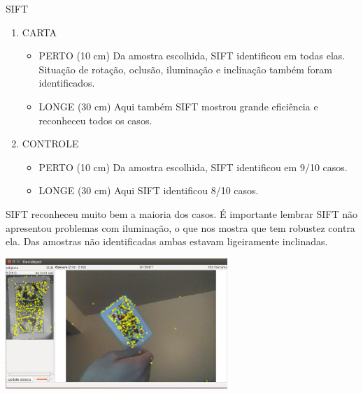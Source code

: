 \documentclass[conference]{IEEEtran}
\begin{document}
 \centering SIFT	\\
 \begin{enumerate}
  \item CARTA
    \begin{itemize}
     \item PERTO (10 cm)
      Da amostra escolhida, SIFT identificou em todas elas. Situa\c{c}\~ao de rota\c{c}\~ao, oclus\~ao, ilumina\c{c}\~ao 
      e inclina\c{c}\~ao tamb\'em foram identificados.
     \item LONGE (30 cm)
      Aqui tamb\'em SIFT mostrou grande efici\^encia e reconheceu todos os casos.
    \end{itemize}
  \item CONTROLE
    \begin{itemize}
     \item PERTO (10 cm)
      Da amostra escolhida, SIFT identificou em 9/10 casos.
     \item LONGE (30 cm)
      Aqui SIFT identificou 8/10 casos. 
    \end{itemize}
 \end{enumerate}

\vspace{1.2\baselineskip}\vspace{-\parskip} 
\raggedright
\nobreak\hspace{.16667em plus .08333em} 
SIFT reconheceu muito bem a maioria dos casos. \'E importante lembrar SIFT n\~ao apresentou problemas com ilumina\c{c}\~ao, 
 o que nos mostra que tem robustez contra ela. Das amostras n\~ao identificadas ambas estavam ligeiramente inclinadas.
 
 		\vspace{2\baselineskip}\vspace{-\parskip}
 		\begin{minipage}{\linewidth}
 		\centering
 		\includegraphics[width=3.3in]{carta8perto}
 		\end{minipage}	
 
\end{document}
